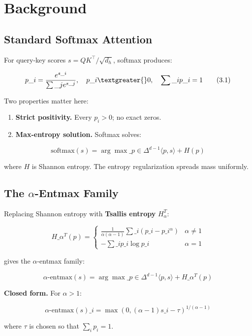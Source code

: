 
\section{Background}

\subsection{Standard Softmax Attention}

For query-key scores $s = Q K^\top / \sqrt{d_h}$, softmax produces:

\[
p\_i = \frac{e^{s\_i}}{\sum\_j e^{s\_j}}, \quad p\_i \textgreater{} 0, \quad \sum\_i p\_i = 1
\tag{3.1}
\]

Two properties matter here:

\begin{enumerate}
\item \textbf{Strict positivity.} Every $p_i > 0$; no exact zeros.
\item \textbf{Max-entropy solution.} Softmax solves:

\end{enumerate}
\[
\text{softmax}(s) = \arg\max\_{p \in \Delta^{d-1}} \langle p, s \rangle + H(p)
\tag{3.2}
\]

where $H$ is Shannon entropy. The entropy regularization spreads mass 
uniformly.

\subsection{The $\alpha$-Entmax Family}

Replacing Shannon entropy with \textbf{Tsallis entropy} $H_\alpha^T$:

\[
H\_\alpha^T(p) = \begin{cases}
\frac{1}{\alpha (\alpha - 1)} \sum\_i (p\_i - p\_i^\alpha) & \alpha \neq 1 \\
-\sum\_i p\_i \log p\_i & \alpha = 1
\end{cases}
\tag{3.3}
\]

gives the $\alpha$-entmax family:

\[
\text{$\alpha$-entmax}(s) = \arg\max\_{p \in \Delta^{d-1}} \langle p, s \rangle + H\_\alpha^T(p)
\tag{3.4}
\]

\textbf{Closed form.} For $\alpha > 1$:

\[
\text{$\alpha$-entmax}(s)\_i = \max\!\left(0, (\alpha - 1) s\_i - \tau\right)^{1/(\alpha - 1)}
\tag{3.5}
\]

where $\tau$ is chosen so that $\sum_i p_i = 1$.

